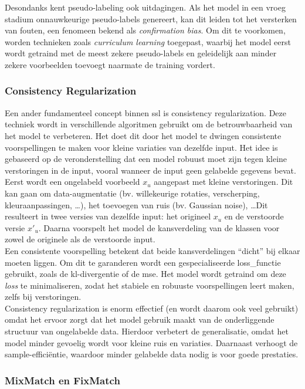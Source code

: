 Desondanks kent pseudo-labeling ook uitdagingen. Als het model in een vroeg stadium onnauwkeurige pseudo-labels genereert, kan dit leiden tot het versterken van fouten, een fenomeen bekend als \emph{confirmation bias}. Om dit te voorkomen, worden technieken zoals \emph{curriculum learning} toegepast, waarbij het model eerst wordt getraind met de meest zekere pseudo-labels en geleidelijk aan minder zekere voorbeelden toevoegt naarmate de training vordert. \autocite{Cascante_Bonilla_2020}

\subsubsection{Consistency Regularization}

Een ander fundamenteel concept binnen \gls{ssl} is consistency regularization. Deze techniek wordt in verschillende algoritmen gebruikt om de betrouwbaarheid van het model te verbeteren. Het doet dit door het model te dwingen consistente voorspellingen te maken voor kleine variaties van dezelfde input. Het idee is gebaseerd op de veronderstelling dat een model robuust moet zijn tegen kleine verstoringen in de input, vooral wanneer de input geen gelabelde gegevens bevat. \\

Eerst wordt een ongelabeld voorbeeld $x_u$ aangepast met kleine verstoringen. Dit kan gaan om data-augmentatie (bv. willekeurige rotaties, verscherping, kleuraanpassingen, \dots), het toevoegen van ruis (bv. Gaussian noise), \dots Dit resulteert in twee versies van dezelfde input: het origineel $x_u$ en de verstoorde versie $x'_u$. Daarna voorspelt het model de kansverdeling van de klassen voor zowel de originele als de verstoorde input. \\

Een consistente voorspelling betekent dat beide kansverdelingen ``dicht'' bij elkaar moeten liggen. Om dit te garanderen wordt een gespecialiseerde \gls{loss_functie} gebruikt, zoals de \gls{kl}-divergentie \autocite{Hall_1987} of de \gls{mse}. Het model wordt getraind om deze \emph{loss} te minimaliseren, zodat het stabiele en robuuste voorspellingen leert maken, zelfs bij verstoringen. \\

Consistency regularization is enorm effectief (en wordt daarom ook veel gebruikt) omdat het ervoor zorgt dat het model gebruik maakt van de onderliggende structuur van ongelabelde data. Hierdoor verbetert de generalisatie, omdat het model minder gevoelig wordt voor kleine ruis en variaties. Daarnaast verhoogt de sample-efficiëntie, waardoor minder gelabelde data nodig is voor goede prestaties. \autocite{Fan_2022}

\subsubsection{MixMatch en FixMatch}

\lipsum[1]